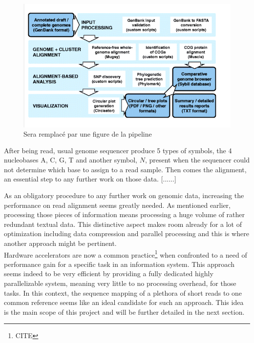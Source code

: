 \begin{minipage}[t]{0.60\textwidth}
\begin{figure}[H]
    \centering
    \includegraphics[scale = 0.4]{Figures/pipeline.png}
    \caption{Sera remplacé par une figure de la pipeline}
    \label{fig:analysispipe}
\end{figure}
\end{minipage}
\begin{minipage}[t]{0.350\textwidth}
After being read, usual genome sequencer produce 5 types of symbols, the 4 nucleobases A, C, G, T and another symbol, $N$, present when the sequencer could not determine which base to assign to a read sample. Then comes the alignment, an essential step to any further work on those data. [......] \\

\end{minipage}
\vspace*{5mm}



As an obligatory procedure to any further work on genomic data, increasing the performance on read alignment seems greatly needed. As mentioned earlier, processing those pieces of information means processing a huge volume of rather redundant textual data. This distinctive aspect makes room already for a lot of optimization including data compression and parallel processing and this is where another approach might be pertinent. \\

Hardware accelerators are now a common practice\footnote{CITE} when confronted to a need of performance gain for a specific task in an information system. This approach seems indeed to be very efficient by providing a fully dedicated highly parallelizable system, meaning very little to no processing overhead, for those tasks. In this context, the sequence mapping of a plethora of short reads to one common reference seems like an ideal candidate for such an approach. This idea is the main scope of this project and will be further detailed in the next section.

